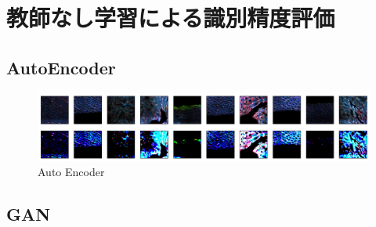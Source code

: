 \section{教師なし学習による識別精度評価}
\subsection{AutoEncoder}

\begin{figure}[H]
	\centering
	\includegraphics[width=0.9\linewidth]{fig/chapter4/unet_ae}
	\caption{Auto Encoder}
	\label{fig:unetae}
\end{figure}


\subsection{GAN}

